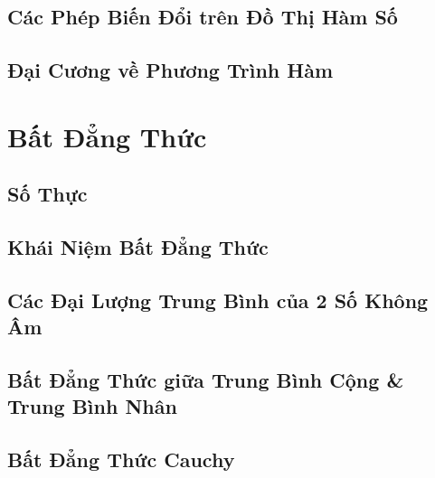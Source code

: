 \documentclass{article}
\numberwithin{equation}{section}
\begin{document}

\subsection{Các Phép Biến Đổi trên Đồ Thị Hàm Số}


\subsection{Đại Cương về Phương Trình Hàm}


\section{Bất Đẳng Thức}

\subsection{Số Thực}


\subsection{Khái Niệm Bất Đẳng Thức}


\subsection{Các Đại Lượng Trung Bình của 2 Số Không Âm}


\subsection{Bất Đẳng Thức giữa Trung Bình Cộng \& Trung Bình Nhân}


\subsection{Bất Đẳng Thức Cauchy}
\end{document}
